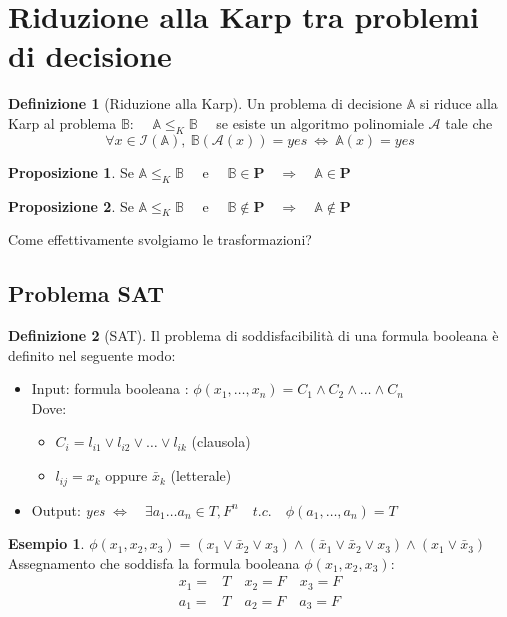 \documentclass[a4paper]{article}
\theoremstyle{definition}
\newtheorem{esempio}{Esempio}[subsection]
\newtheorem{definit}{Definizione}[subsection]
\newtheorem{prop}{Proposizione}[subsection]
\newcommand{\p}{\mathbf{P}}
\newcommand{\prob}[1]{\mathbb{#1}}
\newcommand{\instance}[1]{\mathcal{I}(\prob{#1})}
\newcommand{\alg}[1]{\mathcal{#1}}
\begin{document}
	\section{Riduzione alla Karp tra problemi di decisione}
		\begin{definit}[Riduzione alla Karp]
			Un problema di decisione $ \prob{A} $ si riduce alla Karp al problema $ \prob{B} $: $ \quad \prob{A} \leqslant_K \prob{B} \quad $ se esiste un algoritmo polinomiale $ \alg{A} $ tale che 
			\[
				\forall x \in \instance{A},\ \prob{B}(\alg{A}(x)) = yes \ \Leftrightarrow \ \prob{A}(x) = yes
			\]
		\end{definit}
		
		\begin{prop}
			Se $ \prob{A} \leqslant_K \prob{B} \quad\text{ e }\quad \prob{B}\in \p \quad \Rightarrow\quad \prob{A}\in\p $
		\end{prop} 
		\begin{prop}
			Se $ \prob{A} \leqslant_K \prob{B} \quad\text{ e }\quad \prob{B}\notin \p \quad \Rightarrow\quad \prob{A}\notin\p $
		\end{prop} 
		
		Come effettivamente svolgiamo le trasformazioni?
		
		\subsection{Problema SAT}
			\begin{definit}[SAT]
				Il problema di soddisfacibilità di una formula booleana è definito nel seguente modo:
				\begin{itemize}
					\item Input: formula booleana : $ \phi (x_1, \dots, x_n) = C_1 \wedge C_2 \wedge \dots \wedge C_n $\\
					Dove: \begin{itemize}
						\item $ C_i = l_{i1} \vee l_{i2} \vee \dots \vee l_{ik} $ (clausola)
						\item $ l_{ij} = x_k \text{ oppure } \bar{x}_k $ (letterale)
					\end{itemize}
					\item Output: \textit{yes} $ \Leftrightarrow\quad\exists a_1\dots a_n \in {T,F}^n\quad t.c.\quad \phi(a_1,\dots, a_n) = T $ 
				\end{itemize}
			\end{definit}
			
			\begin{esempio}
				$ \phi(x_1, x_2, x_3) = (x_1\vee \bar{x}_2\vee x_3)\wedge (\bar{x}_1\vee\bar{x}_2\vee x_3) \wedge (x_1\vee \bar{x}_3) $ \\
				Assegnamento che soddisfa la formula booleana $ \phi(x_1, x_2, x_3) $:
				\begin{align*}
					x_1 =& T\quad x_2 = F\quad x_3 = F \\
					a_1 =& T\quad a_2 = F\quad a_3 = F
				\end{align*}
			\end{esempio}
			
\end{document}
